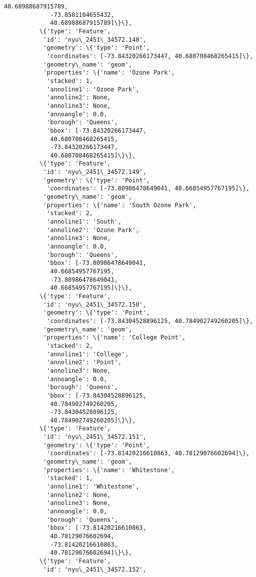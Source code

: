 \documentclass[11pt]{article}
\begin{document}
\begin{Verbatim}[commandchars=\\\{\}]
             40.68988687915789,
             -73.8581104655432,
             40.68988687915789]\}\},
          \{'type': 'Feature',
           'id': 'nyu\_2451\_34572.148',
           'geometry': \{'type': 'Point',
            'coordinates': [-73.84320266173447, 40.680708468265415]\},
           'geometry\_name': 'geom',
           'properties': \{'name': 'Ozone Park',
            'stacked': 1,
            'annoline1': 'Ozone Park',
            'annoline2': None,
            'annoline3': None,
            'annoangle': 0.0,
            'borough': 'Queens',
            'bbox': [-73.84320266173447,
             40.680708468265415,
             -73.84320266173447,
             40.680708468265415]\}\},
          \{'type': 'Feature',
           'id': 'nyu\_2451\_34572.149',
           'geometry': \{'type': 'Point',
            'coordinates': [-73.80986478649041, 40.66854957767195]\},
           'geometry\_name': 'geom',
           'properties': \{'name': 'South Ozone Park',
            'stacked': 2,
            'annoline1': 'South',
            'annoline2': 'Ozone Park',
            'annoline3': None,
            'annoangle': 0.0,
            'borough': 'Queens',
            'bbox': [-73.80986478649041,
             40.66854957767195,
             -73.80986478649041,
             40.66854957767195]\}\},
          \{'type': 'Feature',
           'id': 'nyu\_2451\_34572.150',
           'geometry': \{'type': 'Point',
            'coordinates': [-73.84304528896125, 40.784902749260205]\},
           'geometry\_name': 'geom',
           'properties': \{'name': 'College Point',
            'stacked': 2,
            'annoline1': 'College',
            'annoline2': 'Point',
            'annoline3': None,
            'annoangle': 0.0,
            'borough': 'Queens',
            'bbox': [-73.84304528896125,
             40.784902749260205,
             -73.84304528896125,
             40.784902749260205]\}\},
          \{'type': 'Feature',
           'id': 'nyu\_2451\_34572.151',
           'geometry': \{'type': 'Point',
            'coordinates': [-73.81420216610863, 40.78129076602694]\},
           'geometry\_name': 'geom',
           'properties': \{'name': 'Whitestone',
            'stacked': 1,
            'annoline1': 'Whitestone',
            'annoline2': None,
            'annoline3': None,
            'annoangle': 0.0,
            'borough': 'Queens',
            'bbox': [-73.81420216610863,
             40.78129076602694,
             -73.81420216610863,
             40.78129076602694]\}\},
          \{'type': 'Feature',
           'id': 'nyu\_2451\_34572.152',

\end{Verbatim}
\end{document}

